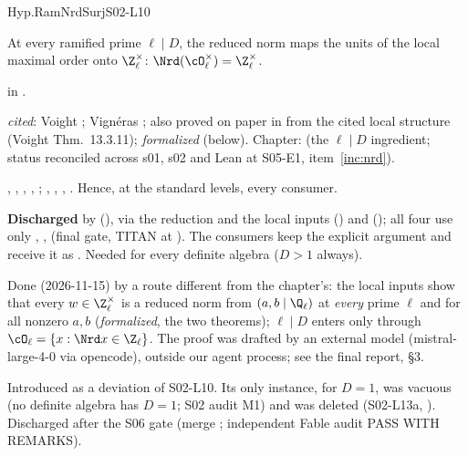 \begin{hypentry}{Hyp.RamNrdSurj}{\kinddis}{S02-L10}
\item[Statement] At every ramified prime $\ell\mid D$, the reduced norm maps the units of the local maximal order onto
  $\Z_\ell^\times$: $\Nrd(\cO_\ell^\times)=\Z_\ell^\times$.
\item[Lean]  in .
\item[Source] \emph{cited}: Voight \cite[Lemma~13.4.9]{Vo}; Vign\'eras \cite[II.1.5]{Vigneras1980}; also proved on paper in
   from the cited local structure (Voight Thm.~13.3.11); \emph{formalized} (below). Chapter:
   (the $\ell\mid D$ ingredient; status reconciled across s01, s02 and Lean at S05-E1, item~\ref{inc:nrd}).
\item[Used by] , , , ,
  ; , , , . Hence, at the
  standard levels, every  consumer.
\item[Status] \textbf{Discharged} by 
  (), via the reduction  and the local inputs
   () and 
  (); all four use only , , 
  (final gate, TITAN  at ). The consumers keep the explicit argument and receive it
  as . Needed for every definite algebra ($D>1$ always).
\item[Discharge] Done (2026-11-15) by a route different from the chapter's: the local inputs show that every
  $w\in\Z_\ell^\times$ is a reduced norm from $(a,b\mid\Q_\ell)$ at \emph{every} prime $\ell$ and for all nonzero $a,b$
  (\emph{formalized}, the two  theorems); $\ell\mid D$ enters only through $\cO_\ell=\{x:\Nrd x\in\Z_\ell\}$.
  The proof was drafted by an external model (mistral-large-4-0 via opencode), outside our agent process; see the
  final report, \S3.
\item[History] Introduced as a deviation of S02-L10. Its only instance, for $D=1$, was vacuous (no definite algebra
  has $D=1$; S02 audit M1) and was deleted (S02-L13a, ). Discharged after the S06 gate (merge
  ; independent Fable audit PASS WITH REMARKS).
\end{hypentry}

